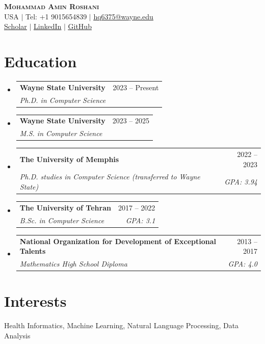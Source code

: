 \documentclass[letterpaper,11pt]{article}
\makeatletter
\newcommand{\resumeSubheading}[4]{
  \vspace{-2pt}\item
    \begin{tabular*}{0.97\textwidth}[t]{l@{\extracolsep{\fill}}r}
      \textbf{#1} & #2 \\
      \textit{\small#3} & \textit{\small #4} \\
    \end{tabular*}\vspace{-7pt}
}
\newcommand{\resumeSubHeadingListStart}{\begin{itemize}[leftmargin=0.15in, label={}]}
\newcommand{\resumeSubHeadingListEnd}{\end{itemize}}
\makeatother
\begin{document}

\begin{center}
    \textbf{\Huge \scshape Mohammad Amin Roshani} \\ \vspace{1pt}
    \small USA $|$ Tel: +1 9015654839 $|$ \href{mailto:hq6375@wayne.edu}{\underline{hq6375@wayne.edu}} \\
    \href{https://scholar.google.com/citations?user=grZF56sAAAAJ\&hl=en}{\underline{Scholar}} $|$
    \href{https://www.linkedin.com/in/mohammad-amin-roshani/}{\underline{LinkedIn}} $|$
    \href{https://github.com/ninjutsoo}{\underline{GitHub}}
\end{center}


\section{Education}
  \resumeSubHeadingListStart
    \resumeSubheading
      {Wayne State University}{2023 -- Present}
      {Ph.D. in Computer Science}{}
    \resumeSubheading
      {Wayne State University}{2023 -- 2025}
      {M.S. in Computer Science}{}
    \resumeSubheading
      {The University of Memphis}{2022 -- 2023}
      {Ph.D. studies in Computer Science (transferred to Wayne State)}{GPA: 3.94}
    \resumeSubheading
      {The University of Tehran}{2017 -- 2022}
      {B.Sc. in Computer Science}{GPA: 3.1}
    \resumeSubheading
      {National Organization for Development of Exceptional Talents}{2013 -- 2017}
      {Mathematics High School Diploma}{GPA: 4.0}
  \resumeSubHeadingListEnd


\section{Interests}
  \begin{itemize}[leftmargin=0.15in, label={}]
    \small{\item{
     Health Informatics, Machine Learning, Natural Language Processing, Data Analysis
    }}
  \end{itemize}
\end{document}
